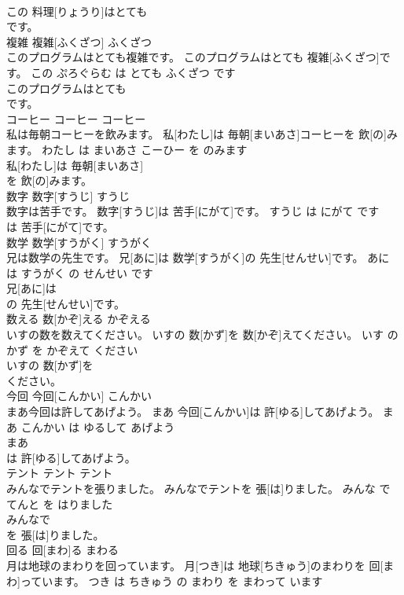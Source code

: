 \documentclass[8pt]{extreport}
\begin{document}
\begin{CJK}{UTF8}{min}
\\	この 料理[りょうり]はとても
\\	です。			
\\	複雑	複雑[ふくざつ]	ふくざつ	
\\	このプログラムはとても複雑です。	このプログラムはとても 複雑[ふくざつ]です。	この ぷろぐらむ は とても ふくざつ です	
\\	このプログラムはとても
\\	です。			
\\	コーヒー	コーヒー	コーヒー	
\\	私は毎朝コーヒーを飲みます。	私[わたし]は 毎朝[まいあさ]コーヒーを 飲[の]みます。	わたし は まいあさ こーひー を のみます	
\\	私[わたし]は 毎朝[まいあさ]
\\	を 飲[の]みます。			
\\	数字	数字[すうじ]	すうじ	
\\	数字は苦手です。	数字[すうじ]は 苦手[にがて]です。	すうじ は にがて です	
\\	は 苦手[にがて]です。			
\\	数学	数学[すうがく]	すうがく	
\\	兄は数学の先生です。	兄[あに]は 数学[すうがく]の 先生[せんせい]です。	あに は すうがく の せんせい です	
\\	兄[あに]は
\\	の 先生[せんせい]です。			
\\	数える	数[かぞ]える	かぞえる	
\\	いすの数を数えてください。	いすの 数[かず]を 数[かぞ]えてください。	いす の かず を かぞえて ください	
\\	いすの 数[かず]を
\\	ください。			
\\	今回	今回[こんかい]	こんかい	
\\	まあ今回は許してあげよう。	まあ 今回[こんかい]は 許[ゆる]してあげよう。	まあ こんかい は ゆるして あげよう	
\\	まあ
\\	は 許[ゆる]してあげよう。			
\\	テント	テント	テント	
\\	みんなでテントを張りました。	みんなでテントを 張[は]りました。	みんな で てんと を はりました	
\\	みんなで
\\	を 張[は]りました。			
\\	回る	回[まわ]る	まわる	
\\	月は地球のまわりを回っています。	月[つき]は 地球[ちきゅう]のまわりを 回[まわ]っています。	つき は ちきゅう の まわり を まわって います	

\end{CJK}
\end{document}
